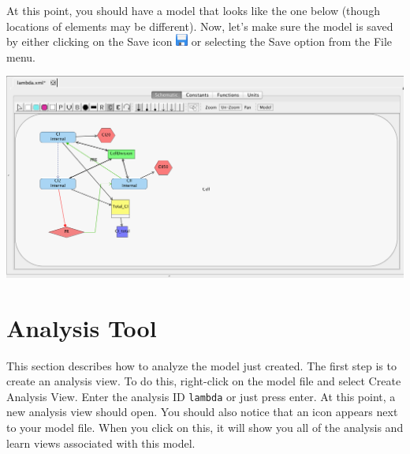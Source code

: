 \documentclass[titlepage,11pt]{article}
\begin{document}
At this point, you should have a model that looks like the one below (though locations of elements may be different).  Now, let's make sure the model is saved by either clicking on the Save icon \includegraphics{../gui/icons/save} or selecting the Save option from the File menu.

\begin{center}
\includegraphics[width=160mm]{screenshots/save}
\end{center}

\section{Analysis Tool}

This section describes how to analyze the model just created.  The first step is to create an analysis view.  To do this, right-click on the model file and select Create Analysis View.  Enter the analysis ID {\tt lambda} or just press enter.  At this point, a new analysis view should open.  You should also notice that an icon appears next to your model file.  When you click on this, it will show you all of the analysis and learn views associated with this model.
\end{document}
